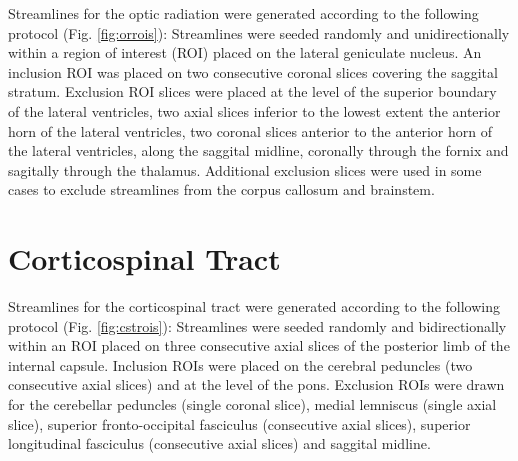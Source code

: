 Streamlines for the optic radiation were generated according to the following protocol (Fig. \ref{fig:orrois}):
Streamlines were seeded randomly and unidirectionally within a region of interest (ROI) placed on the lateral geniculate nucleus.
An inclusion ROI was placed on two consecutive coronal slices covering the saggital stratum.
Exclusion ROI slices were placed at the level of the superior boundary of the lateral ventricles, two axial slices inferior to the lowest extent the anterior horn of the lateral ventricles, two coronal slices anterior to the anterior horn of the lateral ventricles, along the saggital midline, coronally through the fornix and sagitally through the thalamus.
Additional exclusion slices were used in some cases to exclude streamlines from the corpus callosum and brainstem.



\section{Corticospinal Tract}

Streamlines for the corticospinal tract were generated according to the following protocol (Fig. \ref{fig:cstrois}):
Streamlines were seeded randomly and bidirectionally within an ROI placed on three consecutive axial slices of the posterior limb of the internal capsule.
Inclusion ROIs were placed on the cerebral peduncles (two consecutive axial slices) and at the level of the pons.
Exclusion ROIs were drawn for the cerebellar peduncles (single coronal slice), medial lemniscus (single axial slice), superior fronto-occipital fasciculus (consecutive axial slices), superior longitudinal fasciculus (consecutive axial slices) and saggital midline.







